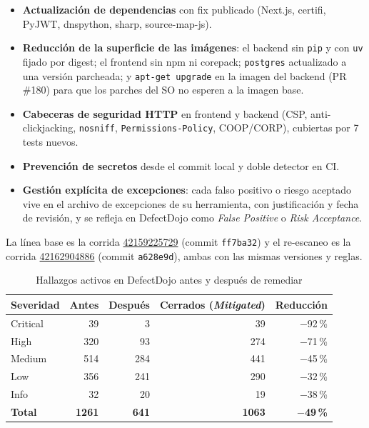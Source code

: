 \begin{itemize}
    \item \textbf{Actualización de dependencias} con fix publicado (Next.js, certifi, PyJWT, dnspython, sharp, source-map-js).
    \item \textbf{Reducción de la superficie de las imágenes}: el backend sin \texttt{pip} y con \texttt{uv} fijado por digest; el frontend sin npm ni corepack; \texttt{postgres} actualizado a una versión parcheada; y \texttt{apt-get upgrade} en la imagen del backend (PR \#180) para que los parches del SO no esperen a la imagen base.
    \item \textbf{Cabeceras de seguridad HTTP} en frontend y backend (CSP, anti-clickjacking, \texttt{nosniff}, \texttt{Permissions-Policy}, COOP/CORP), cubiertas por 7 tests nuevos.
    \item \textbf{Prevención de secretos} desde el commit local y doble detector en CI.
    \item \textbf{Gestión explícita de excepciones}: cada falso positivo o riesgo aceptado vive en el archivo de excepciones de su herramienta, con justificación y fecha de revisión, y se refleja en DefectDojo como \textit{False Positive} o \textit{Risk Acceptance}.
\end{itemize}

La línea base es la corrida \href{https://github.com/jeffreymonjacastro/MisiOps/actions/runs/42159225729}{42159225729} (commit \texttt{ff7ba32}) y el re-escaneo es la corrida \href{https://github.com/jeffreymonjacastro/MisiOps/actions/runs/42162904886}{42162904886} (commit \texttt{a628e9d}), ambas con las mismas versiones y reglas.

\begin{table}[H]
    \centering
    \small
    \caption{Hallazgos activos en DefectDojo antes y después de remediar}
    \label{tab:antes-despues}
    \begin{tabular}{@{}lrrrr@{}}
        \toprule
        \textbf{Severidad} & \textbf{Antes} & \textbf{Después} & \textbf{Cerrados (\textit{Mitigated})} & \textbf{Reducción} \\
        \midrule
        Critical & 39 & 3 & 39 & $-$92\,\% \\
        High & 320 & 93 & 274 & $-$71\,\% \\
        Medium & 514 & 284 & 441 & $-$45\,\% \\
        Low & 356 & 241 & 290 & $-$32\,\% \\
        Info & 32 & 20 & 19 & $-$38\,\% \\
        \midrule
        \textbf{Total} & \textbf{1261} & \textbf{641} & \textbf{1063} & \textbf{$-$49\,\%} \\
        \bottomrule
    \end{tabular}
\end{table}

